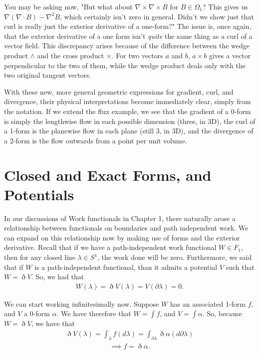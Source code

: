 \documentclass{book}
\begin{document}
You may be asking now, "But what about $\nabla \times \nabla \times B$ for $B \in \Omega_1$? This gives us $\nabla (\nabla \cdot B) - \nabla^2 B$, which certainly isn't zero in general. Didn't we show just that curl is really just the exterior derivative of a one-form?" The issue is, once again, that the exterior derivative of a one form isn't \emph{quite} the same thing as a curl of a vector field. This discrepancy arises because of the difference between the wedge product $\wedge$ and the cross product $\times$. For two vectors $a$ and $b$, $a \times b$ gives a vector perpendicular to the two of them, while the wedge product deals only with the two original tangent vectors. 


With these new, more general geometric expressions for gradient, curl, and divergence, their physical interpretations become immediately clear, simply from the notation. If we extend the flux example, we see that the gradient of a 0-form is simply the lengthwise flow in each possible dimension (three, in 3D), the curl of a 1-form is the planewise flow in each plane (still 3, in 3D), and the divergence of a 2-form is the flow outwards from a point per unit volume. 



\section{Closed and Exact Forms, and Potentials}



In our discussions of Work functionals in Chapter 1, there naturally arose a relationship between functionals on boundaries and path independent work. We can expand on this relationship now by making use of forms and the exterior derivative. Recall that if we have a path-independent work functional $W \in F_1$, then for any closed line $\lambda \in S^1$, the work done will be zero. Furthermore, we said that if $W$ is a path-independent functional, than it admits a potential $V$ such that $W = \eth V$. So, we had that \begin{gather} W(\lambda) = \eth V(\lambda) = V(\partial\lambda) = 0.\end{gather}

We can start working infinitesimally now. Suppose $W$ has an associated 1-form $f$, and $V$ a 0-form $\alpha$. We have therefore that $W = \int f$, and $V = \int \alpha$. So, because $W = \eth V$, we have that \begin{gather} \eth V(\lambda) = \int_\lambda f(d\lambda) = \int_{\partial\lambda} \eth \alpha(d\partial\lambda) \end{gather} \begin{gather}\implies f = \eth\alpha.\end{gather} 
\end{document}
